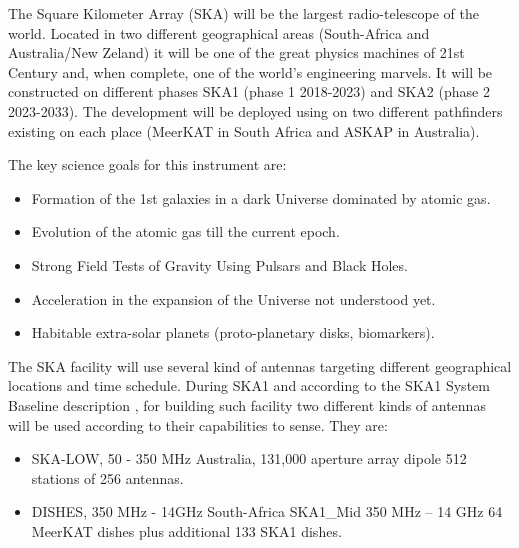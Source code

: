The Square Kilometer Array (SKA) will be the largest radio-telescope of the world. Located in two different geographical areas (South-Africa and Australia/New Zeland) it will be one of the great physics machines of 21st Century and, when complete, one of the world’s engineering marvels. It will be constructed on different phases SKA1 (phase 1 2018-2023) and SKA2 (phase 2 2023-2033). The development will be deployed using on two different pathfinders existing on each place (MeerKAT in South Africa and ASKAP in Australia). 

The key science goals for this instrument are:

\begin{itemize}
	\item {Formation of the 1st galaxies in a dark Universe dominated by atomic gas.}
	\item {Evolution of the atomic gas till the current epoch.}
	\item {Strong Field Tests of Gravity Using Pulsars and Black Holes.}
	\item {Acceleration in the expansion of the Universe not understood yet.}
	\item {Habitable extra-solar planets (proto-planetary disks, biomarkers).}
\end{itemize}

The SKA facility will use several kind of antennas targeting different geographical locations and time schedule. During SKA1 and according to the SKA1 System Baseline description \cite{ska:baseline_description_v2}, for building such facility two different kinds of antennas will be used according to their capabilities to sense. They are: 

\begin{itemize}
	\item {SKA-LOW, 50 - 350 MHz Australia, 131,000 aperture array dipole 512 stations of 256 antennas.}
	\item {DISHES, 350 MHz - 14GHz South-Africa SKA1\_Mid 350 MHz – 14 GHz 64 MeerKAT dishes plus additional 133 SKA1 dishes.}
\end{itemize}


